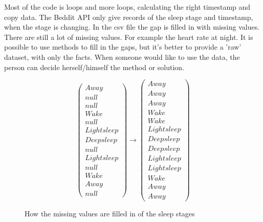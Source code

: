 
			Most of the code is loops and more loops, calculating the right timestamp and copy data. 
			The Beddit API only give records of the sleep stage and timestamp, when the stage is changing.
			In the csv file the gap is filled in with missing values. There are still a lot of missing values. For example the heart rate at night. It is possible to use methods to fill in the gaps, but it's better to provide a 'raw' dataset, with only the facts. When someone would like to use the data, the person can decide herself/himself the method or solution.
			\begin{figure}[h!]
			\[ 
				\left(
				\begin{array}{c}
				Away \\
				null \\
				null \\
				Wake \\
				null \\
				Light sleep \\
				Deep sleep \\
				null \\
				Light sleep \\
				null \\
				Wake \\
				Away \\
				null
				\end{array}
				\right)
				\to
				\left(
				\begin{array}{c}
				Away \\
				Away \\
				Away \\
				Wake \\
				Wake \\
				Light sleep \\
				Deep sleep \\
				Deep sleep \\
				Light sleep \\
				Light sleep \\
				Wake \\
				Away \\
				Away 
				\end{array}
				\right)
			\] 
			\caption{How the missing values are filled in of the sleep stages}
		\end{figure}
		




